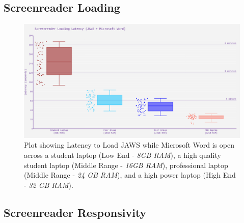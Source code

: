 \documentclass[14pt, letterpaper,twoside]{extreport}
\begin{document}
\hypertarget{screenreader-loading}{%
    \subsection*{Screenreader Loading}\label{screenreader-loading}}
\begin{figure}[!h]
    \centering
    \includegraphics[width=\textwidth]{images/ComputerRBDisplaySpecsTVIFig1.png}
    \caption[Latency to Load JAWS]{Plot showing Latency to Load JAWS while Microsoft Word is open across a student laptop (Low End - \textit{8GB RAM}), a high quality student laptop (Middle Range - \textit{16GB RAM}), professional laptop (Middle Range - \textit{24 GB RAM}), and a high power laptop (High End - \textit{32 GB RAM}). }
    \label{fig:figre 1}
\end{figure}

\pagebreak \hypertarget{screenreader-response}{%
    \subsection*{Screenreader Responsivity}\label{screenreader-response}}
\end{document}

